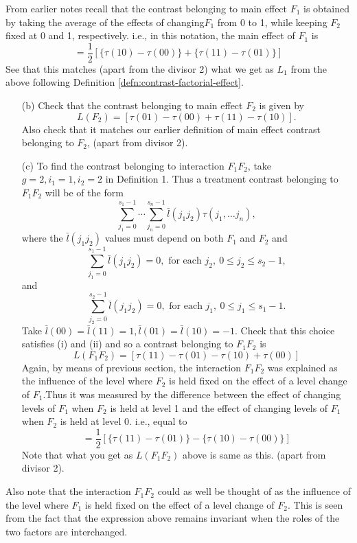 \documentclass[12pt]{article}
\theoremstyle{definition}
\newenvironment{example}[1][\unskip]{
\begin{tcolorbox}[colback=blue!5!white,colframe=blue!75!black, title = {Example #1}, parbox = false] }{\end{tcolorbox} }
\begin{document}
\begin{example}[(Continued)]
    From earlier notes recall that the contrast belonging to main effect  $F_1$ is obtained by taking the average of the effects of changing$ F_1$ from 0 to 1, while keeping $F_2$ fixed at 0 and 1, respectively. i.e., in this notation, the  main effect of $F_1$ is 
    $$ = \frac{1}{2}[\{\tau(10)-\tau(00)\} + \{\tau(11)-\tau(01)\}]$$ See that this matches (apart from the divisor 2) what we get as $L_1$ from the above following Definition \ref{defn:contrast-factorial-effect}.
    
    \begin{enumerate}
    \item[(b)] Check that the contrast belonging to main effect $F_2$ is given by
    $$L(F_2) = [\tau(01) - \tau(00) + \tau(11)-\tau(10)].$$
    Also check that it matches our earlier definition of main effect contrast belonging to $F_2$, (apart from divisor 2).
    
    \item[(c)] To find the contrast belonging to interaction $F_1F_2$, take $g=2, i_1=1, i_2=2$ in Definition 1. Thus a treatment contrast belonging to $F_1F_2$ will be of the form  
    $$\sum_{j_1=0}^{s_1-1} \cdots \sum_{j_n=0}^{s_n-1}  \bar {l}(j_1 j_2) \tau(j_1, \ldots j_n), $$ 
    where the $\bar{l}(j_1j_2)$ values must depend on both $F_1$ and $F_2$ and 
    $$ \sum_{j_1=0}^{s_1-1} \bar{l}(j_1j_2) =0, {\mbox{ for each }}   j_2, \  0\leq j_2 \leq s_2-1,$$ 
    and
    $$ \sum_{j_2=0}^{s_2-1} \bar{l}(j_1j_2) =0, {\mbox{ for each }}  j_1, \ 0\leq j_1 \leq s_1-1.$$	
    Take $\bar{l}(00)=\bar{l}(11)=1, \bar{l}(01)=\bar{l}(10)=-1.$ 
	Check that this choice satisfies (i) and (ii) and so  a contrast belonging to $F_1F_2$  is 
    $$L(F_1F_2) = [\tau(11) - \tau(01) - \tau(10)+ \tau(00)]$$
    Again, by means of previous section, the interaction $F_1F_2$ was explained  as the influence of the level where $F_2$ is held fixed on the effect of a level change of $F_1$.Thus it was measured by the difference between the effect of changing levels of $F_1$ when  $F_2$ is held at level 1 and the effect of changing levels of $F_1$ when $F_2$ is held at level 0. i.e., equal to $$ = \frac{1}{2}[\{\tau(11)-\tau(01)\} - \{\tau(10)-\tau(00)\}]$$ Note that what you get as $ L(F_1F_2)$ above is same as this. (apart from divisor 2).
    \end{enumerate}
\end{example}

\begin{example}[(Continued)]
    Also note that the interaction $F_1F_2$ could as well be thought of as the influence of the level where $F_1$ is held fixed on the effect of a level change of $F_2$. This is seen from  the fact that the expression above remains invariant when the roles of the two factors are interchanged.
\end{example}
\end{document}
